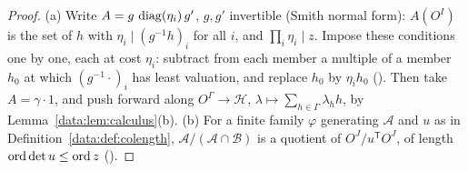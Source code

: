 \begin{proof}
(a) Write $A = g\,\operatorname{diag}(\eta_i)\,g'$, $g, g'$ invertible (Smith normal form): $A(O^I)$ is the set
of $h$ with $\eta_i \mid (g^{-1}h)_i$ for all $i$, and $\prod_i\eta_i \mid z$. Impose these
conditions one by one, each at cost $\eta_i$: subtract from each member a multiple of a member
$h_0$ at which $(g^{-1}\cdot)_i$ has least valuation, and replace $h_0$ by $\eta_ih_0$
(). Then take $A = \gamma\cdot1$, and push forward along
$O^\Gamma \to \mathcal{H}$, $\lambda \mapsto \sum_{h\in\Gamma}\lambda_hh$, by
Lemma~\ref{data:lem:calculus}(b). (b) For a finite family $\varphi$ generating
$\mathcal{A}$ and $u$ as in Definition~\ref{data:def:colength}, $\mathcal{A}/(\mathcal{A}\cap
\mathcal{B})$ is a quotient of $O^J/u^{\mathsf T}O^J$, of length $\operatorname{ord}\det u \le \operatorname{ord} z$
().
\end{proof}
